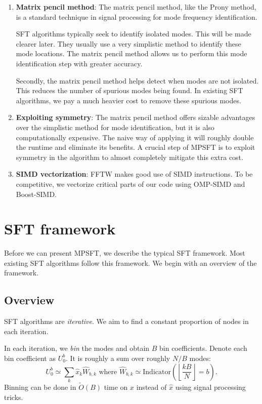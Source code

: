 \documentclass[10pt]{article}
\begin{document}
\begin{enumerate}
\item \textbf{Matrix pencil method}: The matrix pencil method, like the Prony method, is a standard technique in signal processing for mode frequency identification.

SFT algorithms typically seek to identify isolated modes. This will be made clearer later. They usually use a very simplistic method to identify these mode locations. The matrix pencil method allows us to perform this mode identification step with greater accuracy.

Secondly, the matrix pencil method helps detect when modes are not isolated. This reduces the number of spurious modes being found. In existing SFT algorithms, we pay a much heavier cost to remove these spurious modes.

\item \textbf{Exploiting symmetry}: The matrix pencil method offers sizable advantages over the simplistic method for mode identification, but it is also computationally expensive. The naive way of applying it will roughly double the runtime and eliminate its benefits. A crucial step of MPSFT is to exploit symmetry in the algorithm to almost completely mitigate this extra cost.

\item \textbf{SIMD vectorization}: FFTW makes good use of SIMD instructions. To be competitive, we vectorize critical parts of our code using OMP-SIMD and Boost-SIMD.

\end{enumerate}

\section{SFT framework}

Before we can present MPSFT, we describe the typical SFT framework. Most existing SFT algorithms follow this framework. We begin with an overview of the framework.

\subsection{Overview}\label{sec:overview}

SFT algorithms are \emph{iterative}. We aim to find a constant proportion of nodes in each iteration.

In each iteration, we \emph{bin} the modes and obtain $B$ bin coefficients. Denote each bin coefficient as $U^b_0$. It is roughly a sum over roughly $N/B$ modes:
$$U^b_0 \simeq \sum_k \hat{x}_k \hat{W}_{b,k} \text{ where } \hat{W}_{b,k} \simeq \text{Indicator}\left(\left\lfloor \frac{kB}{N} \right\rfloor = b\right).$$
Binning can be done in $\tilde{O}(B)$ time on $x$ instead of $\hat{x}$ using signal processing tricks.
\end{document}
